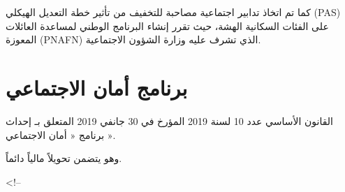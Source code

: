 \documentclass[
  letterpaper,
  DIV=11,
  numbers=noendperiod]{scrreprt}
\begin{document}
كما تم اتخاذ تدابير اجتماعية مصاحبة للتخفيف من تأثير خطة التعديل الهيكلي
(PAS) على الفئات السكانية الهشة، حيث تقرر إنشاء البرنامج الوطني لمساعدة
العائلات المعوزة (PNAFN) الذي تشرف عليه وزارة الشؤون الاجتماعية.

\section{برنامج أمان
الاجتماعي}\label{ux628ux631ux646ux627ux645ux62c-ux623ux645ux627ux646-ux627ux644ux627ux62cux62aux645ux627ux639ux64a}

القانون الأساسي عدد 10 لسنة 2019 المؤرخ في 30 جانفي 2019 المتعلق بـ
إحداث برنامج « أمان الاجتماعي ».

وهو يتضمن تحويلاً مالياً دائماً.

\textless!--
\end{document}
